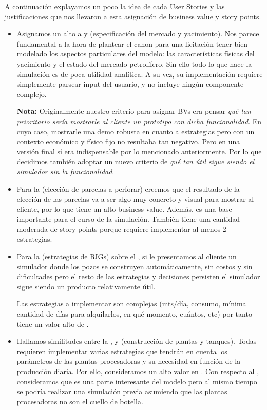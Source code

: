 A continuación explayamos un poco la idea de cada User Stories y las justificaciones que nos llevaron a esta asignación de business value y story points.

\begin{itemize}
  \item Asignamos un alto \BV{} a  y  (especificación del mercado y yacimiento). Nos parece fundamental a la hora de plantear el canon para una licitación tener bien modelado los aspectos particulares del modelo: las características físicas del yacimiento y el estado del mercado petrolífero. Sin ello todo lo que hace la simulación es de poca utilidad analítica. A su vez, su implementación requiere simplemente parsear input del usuario, y no incluye ningún componente complejo.

  \textbf{Nota:} Originalmente nuestro criterio para asignar BVs era pensar \emph{qué tan prioritario sería mostrarle al cliente un prototipo con dicha funcionalidad}. En cuyo caso, mostrarle una demo robusta en cuanto a estrategias pero con un contexto económico y físico fijo no resultaba tan negativo. Pero en una versión final sí era indispensable por lo mencionado anteriormente. Por lo que decidimos también adoptar un nuevo criterio de \emph{qué tan útil sigue siendo el simulador sin la funcionalidad}.

  \item Para la  (elección de parcelas a perforar) creemos que el resultado de la elección de las parcelas va a ser algo muy concreto y visual para mostrar al cliente, por lo que tiene un alto business value. Además, es una base importante para el curso de la simulación.
  También tiene una cantidad moderada de story points porque requiere implementar al menos 2 estrategias.

  \item Para la  (estrategias de RIGs) sobre el \BV{}, si le presentamos al cliente un simulador donde los pozos se construyen automáticamente, sin costos y sin dificultades pero el resto de las estrategias y decisiones persisten el simulador sigue siendo un producto relativamente útil.

	Las estrategias a implementar son complejas (mts/día, consumo, mínima cantidad de días para alquilarlos, en qué momento, cuántos, etc) por tanto tiene un valor alto de \SP{}.

	\item Hallamos similitudes entre la ,  y  (construcción de plantas y tanques). Todas requieren implementar varias estrategias que tendrán en cuenta los parámetros de las plantas procesadoras y su necesidad en función de la producción diaria. Por ello, consideramos un alto valor en \SP{}. Con respecto al \BV{}, consideramos que es una parte interesante del modelo pero al mismo tiempo se podría realizar una simulación previa asumiendo que las plantas procesadoras no son el cuello de botella.


\end{itemize}
